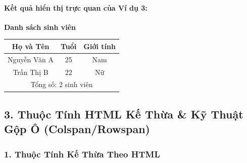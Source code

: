 \paragraph{\textbf{Kết quả hiển thị trực quan của Ví dụ 3:}}
\begin{prettyTableBox}[Kết Quả Hiển Thị Bảng Semantics Trong Trình Duyệt (border="1")]
\centering
\vspace{4pt}
{\sffamily\bfseries\color{darkText} Danh sách sinh viên}\\[6pt]
\bgroup
\renewcommand{\arraystretch}{1.4}
\setlength{\tabcolsep}{14pt}
\begin{tabular}{|c|c|c|}
\hline
\textbf{Họ và Tên} & \textbf{Tuổi} & \textbf{Giới tính} \\
\hline
Nguyễn Văn A & 25 & Nam \\
\hline
Trần Thị B & 22 & Nữ \\
\hline
\multicolumn{3}{|c|}{Tổng số: 2 sinh viên} \\
\hline
\end{tabular}
\egroup
\vspace{4pt}
\end{prettyTableBox}

\subsection{3. Thuộc Tính HTML Kế Thừa \& Kỹ Thuật Gộp Ô (Colspan/Rowspan)}

\subsubsection{1. Thuộc Tính Kế Thừa Theo HTML}

